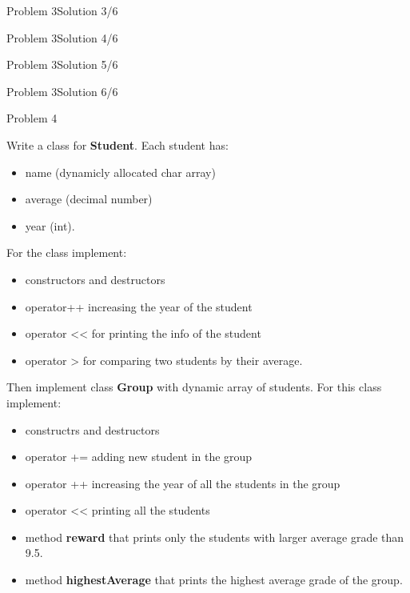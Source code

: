 \begin{frame}[fragile]{Problem 3}{Solution 3/6}

\end{frame}

\begin{frame}[fragile]{Problem 3}{Solution 4/6}

\end{frame}

\begin{frame}[fragile]{Problem 3}{Solution 5/6}

\end{frame}

\begin{frame}[fragile]{Problem 3}{Solution 6/6}

\end{frame}

\begin{frame}{Problem 4}
\begin{scriptsize}
Write a class for \textbf{Student}. Each student has:
\begin{itemize}
  \item name (dynamicly allocated char array)
  \item average (decimal number)
  \item year (int).
\end{itemize}
For the class implement:
\begin{itemize}
  \item constructors and destructors
  \item operator++ increasing the year of the student
  \item operator << for printing the info of the student
  \item operator > for comparing two students by their average.
\end{itemize}

Then implement class \textbf{Group} with dynamic array of students. For this
class implement:
\begin{itemize}
  \item constructrs and destructors
  \item operator += adding new student in the group
  \item operator ++ increasing the year of all the students in the group
  \item operator << printing all the students
  \item method \textbf{reward} that prints only the students with larger average
  grade than 9.5.
  \item method \textbf{highestAverage} that prints the highest average grade of
  the group.
\end{itemize}

\end{scriptsize}
\end{frame}